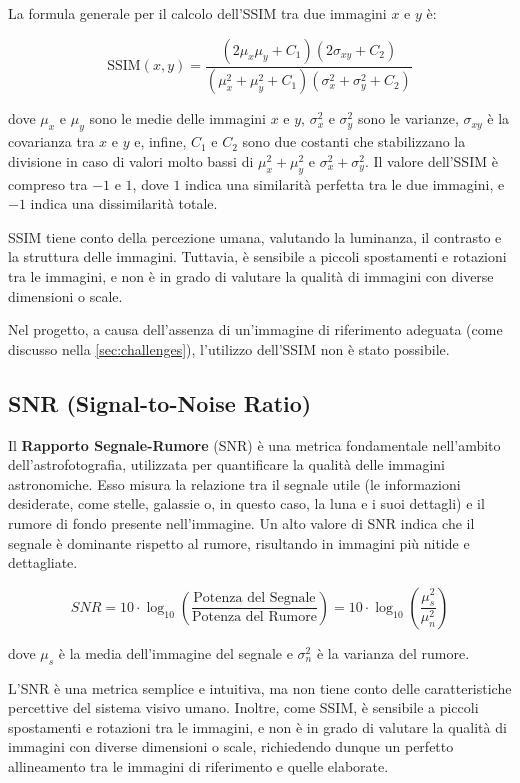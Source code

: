 La formula generale per il calcolo dell'SSIM tra due immagini $x$ e $y$ è:

$$
\text{SSIM}(x, y) = \frac{(2\mu_x\mu_y + C_1)(2\sigma_{xy} + C_2)}{(\mu_x^2 + \mu_y^2 + C_1)(\sigma_x^2 + \sigma_y^2 + C_2)}
$$

dove $\mu_x$ e $\mu_y$ sono le medie delle immagini $x$ e $y$, $\sigma_x^2$ e $\sigma_y^2$ sono le varianze, $\sigma_{xy}$ è la covarianza tra $x$ e $y$ e, infine, $C_1$ e $C_2$ sono due costanti che stabilizzano la divisione in caso di valori molto bassi di $\mu_x^2 + \mu_y^2$ e $\sigma_x^2 + \sigma_y^2$. Il valore dell'SSIM è compreso tra $-1$ e $1$, dove $1$ indica una similarità perfetta tra le due immagini, e $-1$ indica una dissimilarità totale.

SSIM tiene conto della percezione umana, valutando la luminanza, il contrasto e la struttura delle immagini. Tuttavia, è sensibile a piccoli spostamenti e rotazioni tra le immagini, e non è in grado di valutare la qualità di immagini con diverse dimensioni o scale.

Nel progetto, a causa dell'assenza di un'immagine di riferimento adeguata (come discusso nella \cref{sec:challenges}), l'utilizzo dell'SSIM non è stato possibile.

\subsection{SNR (Signal-to-Noise Ratio)} \label{subsec:snr}

Il \textbf{Rapporto Segnale-Rumore} (SNR) è una metrica fondamentale nell'ambito dell'astrofotografia, utilizzata per quantificare la qualità delle immagini astronomiche. Esso misura la relazione tra il segnale utile (le informazioni desiderate, come stelle, galassie o, in questo caso, la luna e i suoi dettagli) e il rumore di fondo presente nell'immagine. Un alto valore di SNR indica che il segnale è dominante rispetto al rumore, risultando in immagini più nitide e dettagliate.

$$
SNR = 10 \cdot \log_{10} \left( \frac {\text{Potenza del Segnale}} {\text{Potenza del Rumore}} \right) = 10 \cdot \log_{10} \left( \frac{\mu_s^2}{\mu_n^2} \right)
$$

dove $\mu_s$ è la media dell'immagine del segnale e $\sigma_n^2$ è la varianza del rumore.

L'SNR è una metrica semplice e intuitiva, ma non tiene conto delle caratteristiche percettive del sistema visivo umano. Inoltre, come SSIM, è sensibile a piccoli spostamenti e rotazioni tra le immagini, e non è in grado di valutare la qualità di immagini con diverse dimensioni o scale, richiedendo dunque un perfetto allineamento tra le immagini di riferimento e quelle elaborate.

